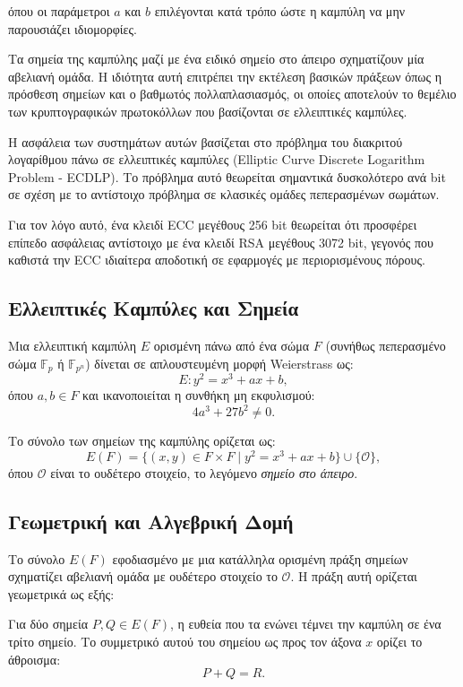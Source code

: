 \documentclass[12pt,a4paper]{report}
\begin{document}
όπου οι παράμετροι $a$ και $b$ επιλέγονται κατά τρόπο ώστε η καμπύλη να μην
παρουσιάζει ιδιομορφίες.

Τα σημεία της καμπύλης μαζί με ένα ειδικό σημείο στο άπειρο σχηματίζουν μία
αβελιανή ομάδα. Η ιδιότητα αυτή επιτρέπει την εκτέλεση βασικών πράξεων όπως η
πρόσθεση σημείων και ο βαθμωτός πολλαπλασιασμός, οι οποίες αποτελούν το
θεμέλιο των κρυπτογραφικών πρωτοκόλλων που βασίζονται σε ελλειπτικές
καμπύλες.

Η ασφάλεια των συστημάτων αυτών βασίζεται στο πρόβλημα του διακριτού
λογαρίθμου πάνω σε ελλειπτικές καμπύλες (Elliptic Curve Discrete Logarithm
Problem - ECDLP). Το πρόβλημα αυτό θεωρείται σημαντικά δυσκολότερο ανά bit σε
σχέση με το αντίστοιχο πρόβλημα σε κλασικές ομάδες πεπερασμένων σωμάτων.

Για τον λόγο αυτό, ένα κλειδί ECC μεγέθους 256 bit θεωρείται ότι προσφέρει
επίπεδο ασφάλειας αντίστοιχο με ένα κλειδί RSA μεγέθους 3072 bit, γεγονός που
καθιστά την ECC ιδιαίτερα αποδοτική σε εφαρμογές με περιορισμένους πόρους.

\subsection{Ελλειπτικές Καμπύλες και Σημεία}

Μια ελλειπτική καμπύλη $E$ ορισμένη πάνω από ένα σώμα $F$ (συνήθως πεπερασμένο σώμα $\mathbb{F}_p$ ή $\mathbb{F}_{p^n}$) δίνεται σε απλουστευμένη μορφή Weierstrass ως:
\[
E: y^2 = x^3 + ax + b,
\]
όπου $a,b \in F$ και ικανοποιείται η συνθήκη μη εκφυλισμού:
\[
4a^3 + 27b^2 \neq 0.
\]

Το σύνολο των σημείων της καμπύλης ορίζεται ως:
\[
E(F) = \{(x,y) \in F \times F \mid y^2 = x^3 + ax + b\} \cup \{\mathcal{O}\},
\]
όπου $\mathcal{O}$ είναι το ουδέτερο στοιχείο, το λεγόμενο \textit{σημείο στο άπειρο}.

\subsection{Γεωμετρική και Αλγεβρική Δομή}

Το σύνολο $E(F)$ εφοδιασμένο με μια κατάλληλα ορισμένη πράξη σημείων σχηματίζει αβελιανή ομάδα με ουδέτερο στοιχείο το $\mathcal{O}$. Η πράξη αυτή ορίζεται γεωμετρικά ως εξής:

Για δύο σημεία $P, Q \in E(F)$, η ευθεία που τα ενώνει τέμνει την καμπύλη σε ένα τρίτο σημείο. Το συμμετρικό αυτού του σημείου ως προς τον άξονα $x$ ορίζει το άθροισμα:
\[
P + Q = R.
\]
\end{document}
